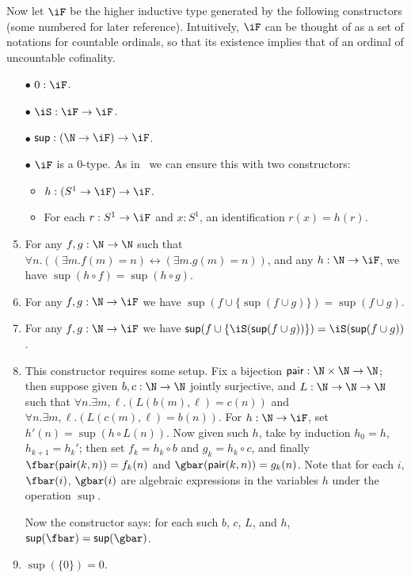 Now let $\iF$ be the higher inductive type generated by the following constructors (some numbered for later reference).
Intuitively, $\iF$ can be thought of as a set of notations for countable ordinals, so that its existence implies that of an ordinal of uncountable cofinality.
\ifmpcps
  \begin{enumerate} \renewcommand{\theenumi}{(\arabic{enumi})}
\else
  \begin{enumerate}[label=(\arabic*)]
\fi
\item[$\bullet$] $0:\iF$.
\item[$\bullet$] $\iS:\iF\to\iF$.
\item[$\bullet$] $\sup : (\N\to\iF)\to\iF$.
\item[$\bullet$] $\iF$ is a 0-type.
  As in~\cite[]{hottbook} we can ensure this with two constructors:
  \begin{itemize}
  \item $h: (S^1\to \iF) \to \iF$.
  \item For each $r:S^1\to\iF$ and $x:S^1$, an identification $r(x) = h(r)$.
  \end{itemize}
\item For any $f,g:\N\to\N$ such that $\forall n. ((\exists m. f(m)=n) \leftrightarrow (\exists m. g(m)=n))$, and any $h:\N\to \iF$, we have $\sup(h\circ f) = \sup(h\circ g)$.\label{item:f1}
\item For any $f,g:\N\to\iF$ we have $\sup(f \cup \{\sup(f\cup g)\}) = \sup(f\cup g)$.\label{item:f2}
\item For any $f,g:\N\to\iF$ we have $\sup(f \cup \{\iS(\sup(f\cup g))\}) = \iS(\sup(f\cup g))$.\label{item:f3}
\item This constructor requires some setup. Fix a bijection $\mathsf{pair}:\N\times\N\to \N$; then suppose given $b,c:\N\to\N$ jointly surjective, and $L:\N\to\N\to\N$ such that $\forall n. \exists m,\ell. (L(b(m),\ell)=c(n))$ and $\forall n. \exists m,\ell. (L(c(m),\ell)=b(n))$.  For $h:\N\to\iF$, set $h'(n) = \sup(h\circ L(n))$.  Now given such $h$, take by induction $h_0 = h$, $h_{k+1} = h_k'$; then set $f_k = h_k \circ b$ and $g_k = h_k \circ c$, and finally $\fbar(\mathsf{pair}(k,n)) = f_k(n)$ and $\gbar(\mathsf{pair}(k,n)) = g_k(n)$. Note that for each $i$, $\fbar(i)$, $\gbar(i)$ are algebraic expressions in the variables $h$ under the operation $\sup$.

  Now the constructor says: for each such $b$, $c$, $L$, and $h$, $\sup(\fbar) = \sup(\gbar)$.\label{item:f4}
\item $\sup(\{0\}) = 0$.\label{item:f5}
\end{enumerate}


\end{enumerate}
